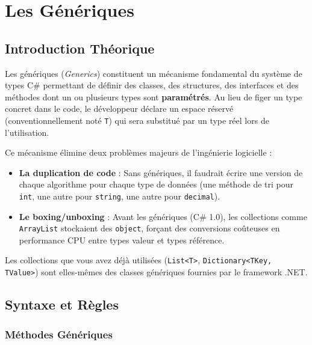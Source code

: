 
\newpage
\section{Les Génériques}

\subsection{Introduction Théorique}

Les génériques (\textit{Generics}) constituent un mécanisme fondamental du système de types C\# permettant de définir des classes, des structures, des interfaces et des méthodes dont un ou plusieurs types sont \textbf{paramétrés}. Au lieu de figer un type concret dans le code, le développeur déclare un espace réservé (conventionnellement noté \texttt{T}) qui sera substitué par un type réel lors de l'utilisation.

Ce mécanisme élimine deux problèmes majeurs de l'ingénierie logicielle :
\begin{itemize}
    \item \textbf{La duplication de code} : Sans génériques, il faudrait écrire une version de chaque algorithme pour chaque type de données (une méthode de tri pour \texttt{int}, une autre pour \texttt{string}, une autre pour \texttt{decimal}).
    \item \textbf{Le boxing/unboxing} : Avant les génériques (C\# 1.0), les collections comme \texttt{ArrayList} stockaient des \texttt{object}, forçant des conversions coûteuses en performance CPU entre types valeur et types référence.
\end{itemize}

Les collections que vous avez déjà utilisées (\texttt{List<T>}, \texttt{Dictionary<TKey, TValue>}) sont elles-mêmes des classes génériques fournies par le framework .NET.

\subsection{Syntaxe et Règles}

\subsubsection{Méthodes Génériques}

